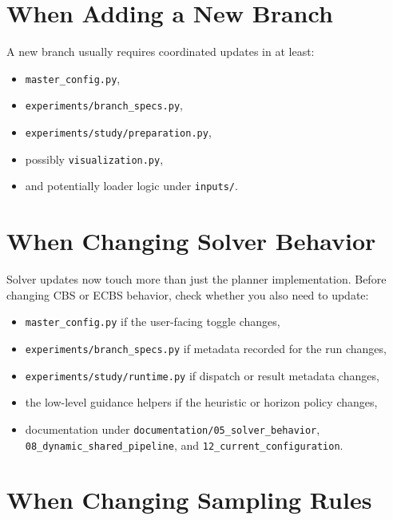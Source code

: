 \documentclass[11pt]{article}
\begin{document}
\section{When Adding a New Branch}

A new branch usually requires coordinated updates in at least:
\begin{itemize}[leftmargin=2em]
    \item \texttt{master\_config.py},
    \item \texttt{experiments/branch\_specs.py},
    \item \texttt{experiments/study/preparation.py},
    \item possibly \texttt{visualization.py},
    \item and potentially loader logic under \texttt{inputs/}.
\end{itemize}

\section{When Changing Solver Behavior}

Solver updates now touch more than just the planner implementation. Before changing CBS or ECBS behavior, check whether you also need to update:
\begin{itemize}[leftmargin=2em]
    \item \texttt{master\_config.py} if the user-facing toggle changes,
    \item \texttt{experiments/branch\_specs.py} if metadata recorded for the run changes,
    \item \texttt{experiments/study/runtime.py} if dispatch or result metadata changes,
    \item the low-level guidance helpers if the heuristic or horizon policy changes,
    \item documentation under \texttt{documentation/05\_solver\_behavior}, \texttt{08\_dynamic\_shared\_pipeline}, and \texttt{12\_current\_configuration}.
\end{itemize}

\section{When Changing Sampling Rules}
\end{document}

